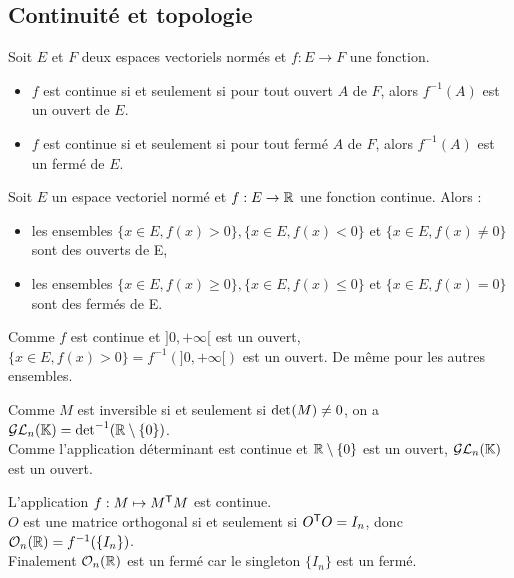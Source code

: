 \documentclass{book}
\begin{document}
\subsection{Continuité et topologie}
\begin{Theoreme}
Soit $E$ et $F$ deux espaces vectoriels normés et $f:E\to F$ une fonction.
\begin{itemize}
\item $f$ est continue si et seulement si pour tout ouvert $A$ de  $F$, alors $f^{-1}(A)$ est un ouvert de $E$.
\item $f$ est continue si et seulement si pour tout fermé $A$ de  $F$, alors $f^{-1}(A)$ est un fermé de $E$.
\end{itemize}
\end{Theoreme}
\begin{Corollaire}[]
Soit $E$ un espace vectoriel normé et $f:E\to \R$ une fonction continue.
Alors :
\begin{itemize}
\item les ensembles $\{x \in E, f (x) > 0 \}, \{x \in E, f (x) < 0 \}$ et $\{x \in E, f (x)\neq 0 \}$ sont des ouverts de E,
\item les ensembles $\{x \in E, f (x) \geq 0 \}, \{x \in E, f (x) \leq 0 \}$ et $\{x \in E, f (x)= 0 \}$ sont des fermés de E. 
\end{itemize}
\end{Corollaire}
\begin{Demonstration}
Comme $f$ est continue et $]0,+\infty[$ est un ouvert, $\{x \in E, f (x) > 0 \}=f^{-1}(]0,+\infty[)$ est un ouvert. De même pour les autres ensembles.
\end{Demonstration}
\begin{Exemple}
Comme $M$ est inversible si et seulement si $\Det[](M)\neq 0$, on a   $\GLnK=\Det[]^{-1}(\R\setminus \{0\})$.\\  
Comme l'application déterminant est continue et $\R\setminus \{0\}$ est un ouvert, $\GLnK$ est un ouvert. 
\end{Exemple}
\begin{Exemple}
L'application $f:M\mapsto \transposee{M}M $ est continue.\\
$O$ est une matrice orthogonal si et seulement si $\transposee{O}O=I_n$, donc $\OnR=f^{-1}(\{I_n\})$.\\
Finalement   $\OnR$ est un fermé car  le singleton $\{I_n\}$ est un fermé. 
\end{Exemple}
\end{document}
